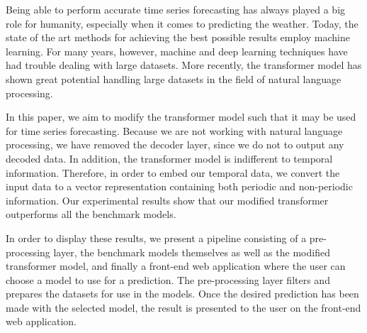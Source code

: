 Being able to perform accurate time series forecasting has always played a big role for humanity, especially when it comes to predicting the weather. 
Today, the state of the art methods for achieving the best possible results employ machine learning. 
For many years, however, machine and deep learning techniques have had trouble dealing with large datasets. 
More recently, the transformer model has shown great potential handling large datasets in the field of natural language processing.

In this paper, we aim to modify the transformer model such that it may be used for time series forecasting. 
Because we are not working with natural language processing, we have removed the decoder layer, since we do not to output any decoded data. 
In addition, the transformer model is indifferent to temporal information. 
Therefore, in order to embed our temporal data, we convert the input data to a vector representation containing both periodic and non-periodic information.
Our experimental results show that our modified transformer outperforms all the benchmark models.

In order to display these results, we present a pipeline consisting of a pre-processing layer, the benchmark models themselves as well as the modified transformer model, and finally a front-end web application where the user can choose a model to use for a prediction.
The pre-processing layer filters and prepares the datasets for use in the models.
Once the desired prediction has been made with the selected model, the result is presented to the user on the front-end web application.